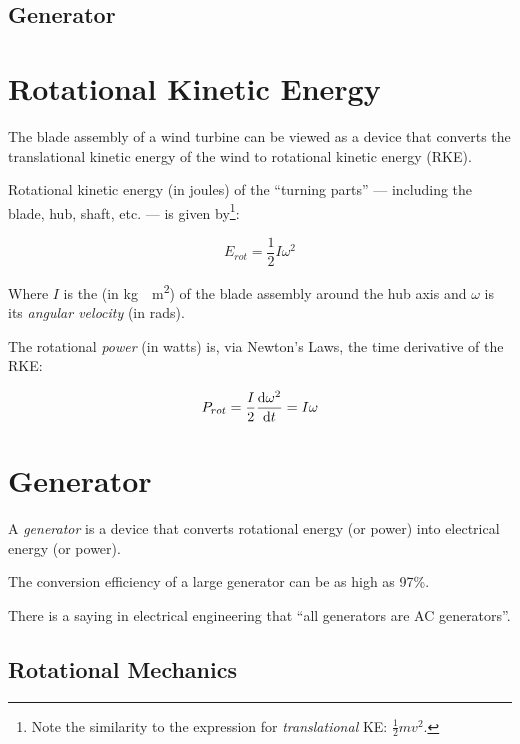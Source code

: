 \documentclass[11pt]{article}
\begin{document}
\subsection{Generator}



\clearpage
\section{Rotational Kinetic Energy}

The blade assembly of a wind turbine can be viewed as a device that
converts the translational kinetic energy of the wind to rotational
kinetic energy (RKE).

Rotational kinetic energy (in joules) of the ``turning parts'' ---
including the blade, hub, shaft, etc. --- is given by\footnote{Note
  the similarity to the expression for \emph{translational} KE:
  $\frac{1}{2}mv^2$.}:

\begin{equation}
\label{eqn:rke}
E_{rot} = \frac{1}{2}I\omega^2
\end{equation}

Where $I$ is the  (in \unit{kg\cdot m^2}) of
the blade assembly around the hub axis and $\omega$ is its
\emph{angular velocity} (in \unit{rad}{s}). 

The rotational \emph{power} (in watts) is, via Newton's Laws, the time
derivative of the RKE:

\begin{equation}
\label{eqn:rpow}
P_{rot} = \frac{I}{2}\deedee{\omega^2}{t} = I\omega
\end{equation}

\section{Generator}

A \emph{generator} is a device that converts rotational energy (or
power) into electrical energy (or power).

The conversion efficiency of a large generator can be as high as 97\%.

There is a saying in electrical engineering that ``all generators are AC generators''.



\appendix

\subsection{Rotational Mechanics}
\end{document}
